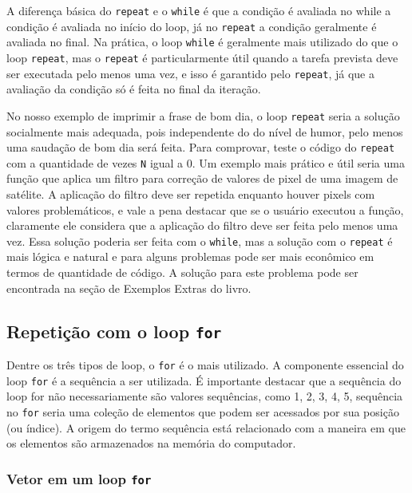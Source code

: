 \documentclass[
  11pt,
  a5paper,
  openany]{book}
\begin{document}
A diferença básica do \texttt{repeat} e o \texttt{while} é que a condição é avaliada no while a condição é avaliada no início do loop, já no \texttt{repeat} a condição geralmente é avaliada no final. Na prática, o loop \texttt{while} é geralmente mais utilizado do que o loop \texttt{repeat}, mas o \texttt{repeat} é particularmente útil quando a tarefa prevista deve ser executada pelo menos uma vez, e isso é garantido pelo \texttt{repeat}, já que a avaliação da condição só é feita no final da iteração.

No nosso exemplo de imprimir a frase de bom dia, o loop \texttt{repeat} seria a solução socialmente mais adequada, pois independente do do nível de humor, pelo menos uma saudação de bom dia será feita. Para comprovar, teste o código do \texttt{repeat} com a quantidade de vezes \texttt{N} igual a 0. Um exemplo mais prático e útil seria uma função que aplica um filtro para correção de valores de pixel de uma imagem de satélite. A aplicação do filtro deve ser repetida enquanto houver pixels com valores problemáticos, e vale a pena destacar que se o usuário executou a função, claramente ele considera que a aplicação do filtro deve ser feita pelo menos uma vez. Essa solução poderia ser feita com o \texttt{while}, mas a solução com o \texttt{repeat} é mais lógica e natural e para alguns problemas pode ser mais econômico em termos de quantidade de código. A solução para este problema pode ser encontrada na seção de Exemplos Extras do livro.

\hypertarget{repetiuxe7uxe3o-com-o-loop-for}{%
\subsection{\texorpdfstring{Repetição com o loop \texttt{for}}{Repetição com o loop for}}\label{repetiuxe7uxe3o-com-o-loop-for}}

Dentre os três tipos de loop, o \texttt{for} é o mais utilizado. A componente essencial do loop \texttt{for} é a sequência a ser utilizada. É importante destacar que a sequência do loop for não necessariamente são valores sequências, como 1, 2, 3, 4, 5, sequência no \texttt{for} seria uma coleção de elementos que podem ser acessados por sua posição (ou índice). A origem do termo sequência está relacionado com a maneira em que os elementos são armazenados na memória do computador.

\hypertarget{vetor-em-um-loop-for}{%
\subsubsection*{\texorpdfstring{Vetor em um loop \texttt{for}}{Vetor em um loop for}}\label{vetor-em-um-loop-for}}
\end{document}
